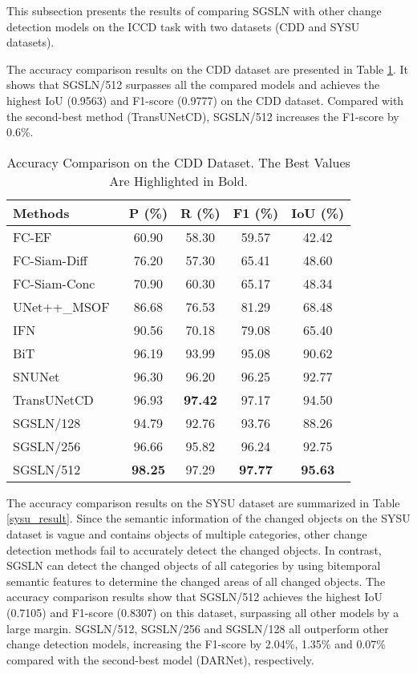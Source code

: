 \documentclass[journal]{IEEEtran}
\begin{document}
This subsection presents the results of comparing SGSLN with other change detection models on the ICCD task with two datasets (CDD and SYSU datasets).

The accuracy comparison results on the CDD dataset are presented in Table \ref{cdd_result}. It shows that SGSLN/512 surpasses all the compared models and achieves the highest IoU (0.9563) and F1-score (0.9777) on the CDD dataset. Compared with the second-best method (TransUNetCD), SGSLN/512 increases the F1-score by 0.6\%.

\begin{table}[!ht]
\caption{Accuracy Comparison on the CDD Dataset. The Best Values Are Highlighted in Bold.}
\label{cdd_result}
\centering
\begin{tabular}{lcccc}
\toprule
Methods & P (\%) & R (\%) & F1 (\%) & IoU (\%) \\
\midrule
FC-EF~\cite{fcef} & 60.90 & 58.30 & 59.57 & 42.42 \\
FC-Siam-Diff~\cite{fcef} & 76.20 & 57.30 & 65.41 & 48.60 \\
FC-Siam-Conc~\cite{fcef} & 70.90 & 60.30 & 65.17 & 48.34 \\
UNet++\_MSOF~\cite{etecd} & 86.68 & 76.53 & 81.29 & 68.48\\
IFN~\cite{dsifn} & 90.56 & 70.18 & 79.08 & 65.40 \\
BiT~\cite{bit} & 96.19 & 93.99 & 95.08 & 90.62 \\
SNUNet~\cite{snu} & 96.30 & 96.20 & 96.25 & 92.77\\ 
TransUNetCD~\cite{transunetcd} & 96.93 & \textbf{97.42} & 97.17 & 94.50 \\
SGSLN/128 & 94.79 & 92.76 & 93.76 & 88.26 \\
SGSLN/256 & 96.66 & 95.82 & 96.24 & 92.75 \\
SGSLN/512 & \textbf{98.25} & 97.29 & \textbf{97.77} & \textbf{95.63} \\
\bottomrule
\end{tabular}
\end{table}

The accuracy comparison results on the SYSU dataset are summarized in Table \ref{sysu_result}. Since the semantic information of the changed objects on the SYSU dataset is vague and contains objects of multiple categories, other change detection methods fail to accurately detect the changed objects. In contrast, SGSLN can detect the changed objects of all categories by using bitemporal semantic features to determine the changed areas of all changed objects. The accuracy comparison results show that SGSLN/512 achieves the highest IoU (0.7105) and F1-score (0.8307) on this dataset, surpassing all other models by a large margin. SGSLN/512, SGSLN/256 and SGSLN/128 all outperform other change detection models, increasing the F1-score by 2.04\%, 1.35\% and 0.07\% compared with the second-best model (DARNet), respectively.
\end{document}
